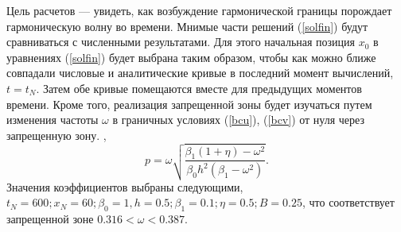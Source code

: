   
Цель расчетов --- увидеть, как возбуждение гармонической границы порождает гармоническую волну во времени. Мнимые части решений (\ref{solfin}) будут сравниваться с численными результатами. Для этого начальная позиция $ x_0 $ в уравнениях (\ref{solfin}) будет выбрана таким образом, чтобы как можно ближе совпадали числовые и аналитические кривые в последний момент вычислений, $ t = t_N $. Затем обе кривые помещаются вместе для предыдущих моментов времени. Кроме того, реализация запрещенной зоны будет изучаться путем изменения частоты $ \omega $ в граничных условиях (\ref{bcu}), (\ref{bcv}) от нуля через запрещенную зону. ,
\[
p=\omega\sqrt{\frac{\beta_1(1+\eta)-\omega^2}{\beta_0 h^2(\beta_1-\omega^2)}}.
\]
Значения коэффициентов выбраны следующими, $t_N = 600; x_N = 60;\beta_0=1, h = 0.5; \beta_1 = 0.1; \eta = 0.5;  B=0.25$, что соответствует запрещенной зоне $0.316<\omega<0.387$.
  
